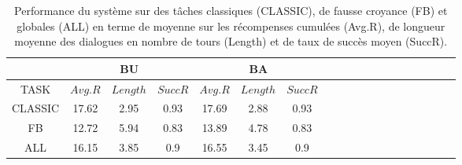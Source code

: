 \documentclass[a4paper,11pt,twoside]{StyleThese}
\begin{document}




\begin{table}
 \vspace{-10pt}
\centering
\scriptsize
\renewcommand{\arraystretch}{1.2}
\begin{tabular}{|c||*{3}{c|cc||}*{3}{c|cc|}}


\multicolumn{1}{c}{} & \multicolumn{3}{c}{BU} & \multicolumn{3}{c}{BA} \\

\hline
TASK  & $Avg.R$ & $Length$ & $SuccR$  
      & $Avg.R$ & $Length$ & $SuccR$  \\ 
\hline
 	CLASSIC & 17.62 & 2.95 & 0.93 
            & 17.69 & 2.88 &  0.93 \\
   	FB	& 12.72 & 5.94 &  0.83 
        & 13.89 & 4.78&  0.83	 \\
    \hline
    ALL & 16.15 & 3.85&  0.9 
        & 16.55 & 3.45& 0.9 \\
        
\hline
\end{tabular}
\caption{Performance du système sur des tâches classiques (CLASSIC), de fausse croyance (FB) et globales (ALL) en terme de moyenne sur les récompenses cumulées
 (Avg.R), de longueur moyenne des dialogues en nombre de tours (Length) et de taux de succès moyen (SuccR).}
 \label{table:hri-perfs}    
 \vspace{-10pt}
\end{table}
\end{document}
